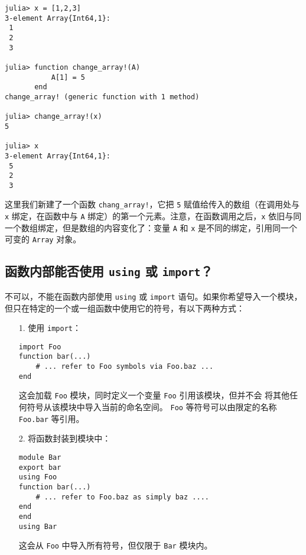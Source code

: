 \begin{verbatim}
julia> x = [1,2,3]
3-element Array{Int64,1}:
 1
 2
 3

julia> function change_array!(A)
           A[1] = 5
       end
change_array! (generic function with 1 method)

julia> change_array!(x)
5

julia> x
3-element Array{Int64,1}:
 5
 2
 3
\end{verbatim}



这里我们新建了一个函数 \texttt{chang\_array!}，它把 \texttt{5} 赋值给传入的数组（在调用处与 \texttt{x} 绑定，在函数中与 \texttt{A} 绑定）的第一个元素。注意，在函数调用之后，\texttt{x} 依旧与同一个数组绑定，但是数组的内容变化了：变量 \texttt{A} 和 \texttt{x} 是不同的绑定，引用同一个可变的 \texttt{Array} 对象。



\hypertarget{10749355378766657270}{}


\subsection{函数内部能否使用 \texttt{using} 或 \texttt{import}？}



不可以，不能在函数内部使用 \texttt{using} 或 \texttt{import} 语句。如果你希望导入一个模块，但只在特定的一个或一组函数中使用它的符号，有以下两种方式：



\begin{itemize}
\item[1. ] 使用 \texttt{import}：


\begin{verbatim}
import Foo
function bar(...)
    # ... refer to Foo symbols via Foo.baz ...
end
\end{verbatim}

这会加载 \texttt{Foo} 模块，同时定义一个变量 \texttt{Foo} 引用该模块，但并不会 将其他任何符号从该模块中导入当前的命名空间。 \texttt{Foo} 等符号可以由限定的名称 \texttt{Foo.bar} 等引用。


\item[2. ] 将函数封装到模块中：


\begin{verbatim}
module Bar
export bar
using Foo
function bar(...)
    # ... refer to Foo.baz as simply baz ....
end
end
using Bar
\end{verbatim}

这会从 \texttt{Foo} 中导入所有符号，但仅限于 \texttt{Bar} 模块内。

\end{itemize}


